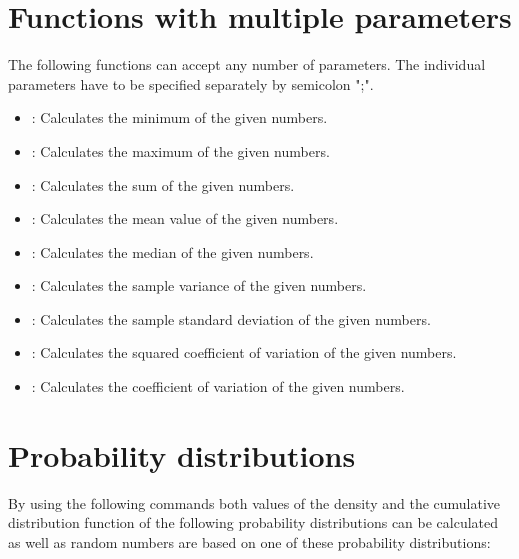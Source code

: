 \chapter{Functions with multiple parameters}

The following functions can accept any number of parameters.
The individual parameters have to be specified separately by semicolon ";".

\begin{itemize}

\item
{}:
Calculates the minimum of the given numbers.

\item
{}:
Calculates the maximum of the given numbers.

\item
{}:
Calculates the sum of the given numbers.

\item
{}:
Calculates the mean value of the given numbers.

\item
{}:
Calculates the median of the given numbers.

\item
{}:
Calculates the sample variance of the given numbers.

\item
{}:
Calculates the sample standard deviation of the given numbers.

\item
{}:
Calculates the squared coefficient of variation of the given numbers.

\item
{}:
Calculates the coefficient of variation of the given numbers.

\end{itemize}



\chapter{Probability distributions}\label{sec:Wahrscheinlichkeitsverteilungen}

By using the following commands both values of the density and the cumulative distribution function
of the following probability distributions can be calculated as well as random numbers are based on
one of these probability distributions:



